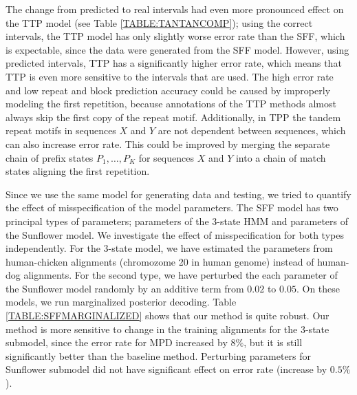 The change from predicted to real intervals had even more pronounced effect on
the TTP model (see Table \ref{TABLE:TANTANCOMP}); using the correct intervals,
the TTP model has only slightly worse error rate than the SFF, which is
expectable, since the data were generated from the SFF model. However, using
predicted intervals, TTP has a significantly higher error rate, which means
that TTP is even more sensitive to the intervals that are used. The high error
rate and low repeat and block prediction accuracy could be caused by improperly
modeling the first repetition, because annotations of the TTP methods almost
always skip the first copy of the repeat motif. Additionally, in TPP the
tandem repeat motifs in sequences $X$ and $Y$ are not dependent between sequences, which can  also increase
error rate.  This could be improved by merging the separate chain of prefix
states $P_1, \dots, P_K$ for sequences $X$ and $Y$ into a chain of match states
aligning the first repetition.


Since we use the same model for generating data and testing, we tried to
quantify the effect of misspecification of the model parameters. The SFF model
has two principal types of parameters; parameters of the 3-state HMM and
parameters of the Sunflower model. We investigate the effect of
{misspecification} for both types independently. For the 3-state
model, we have estimated the parameters from human-chicken alignments (chromozome 20 in human genome) instead of
human-dog alignments. For the second type, we have perturbed the each parameter
of the Sunflower model randomly by an additive term from $0.02$ to $0.05$. On these
models, we run marginalized posterior decoding. Table
\ref{TABLE:SFFMARGINALIZED} shows that our method is quite robust. Our method
is more sensitive to change in the training alignments for the 3-state submodel, since the error rate for
MPD increased by $8\%$, but it is still significantly better than the baseline
method. Perturbing parameters for Sunflower submodel did not have significant
effect on error rate (increase by $0.5\%$). 

